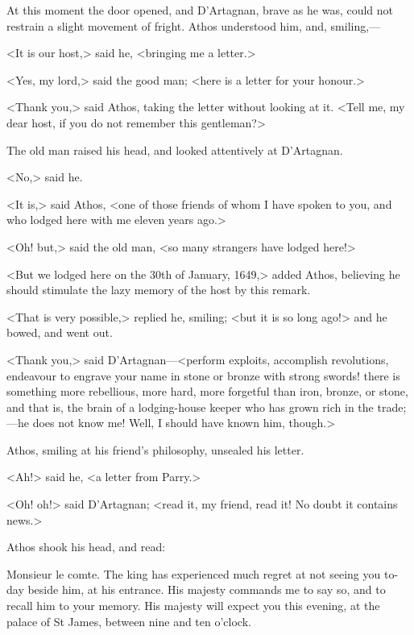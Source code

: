 At this moment the door opened, and D'Artagnan, brave as he was, could not restrain a slight movement of fright. Athos understood him, and, smiling,—

<It is our host,> said he, <bringing me a letter.>

<Yes, my lord,> said the good man; <here is a letter for your honour.>

<Thank you,> said Athos, taking the letter without looking at it. <Tell me, my dear host, if you do not remember this gentleman?>

The old man raised his head, and looked attentively at D'Artagnan.

<No,> said he.

<It is,> said Athos, <one of those friends of whom I have spoken to you, and who lodged here with me eleven years ago.>

<Oh! but,> said the old man, <so many strangers have lodged here!>

<But we lodged here on the 30th of January, 1649,> added Athos, believing he should stimulate the lazy memory of the host by this remark.

<That is very possible,> replied he, smiling; <but it is so long ago!> and he bowed, and went out.

<Thank you,> said D'Artagnan—<perform exploits, accomplish revolutions, endeavour to engrave your name in stone or bronze with strong swords! there is something more rebellious, more hard, more forgetful than iron, bronze, or stone, and that is, the brain of a lodging-house keeper who has grown rich in the trade;—he does not know me! Well, I should have known him, though.>

Athos, smiling at his friend's philosophy, unsealed his letter.

<Ah!> said he, <a letter from Parry.>

<Oh! oh!> said D'Artagnan; <read it, my friend, read it! No doubt it contains news.>

Athos shook his head, and read:

\begin{mail}{}{Monsieur le comte.}
The king has experienced much regret at not seeing you to-day beside him, at his entrance. His majesty commands me to say so, and to recall him to your memory. His majesty will expect you this evening, at the palace of St James, between nine and ten o'clock.

\end{mail}

